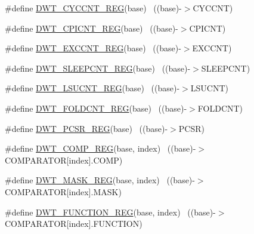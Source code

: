 \begin{DoxyCompactItemize}
\#define \hyperlink{group___d_w_t___register___accessor___macros_ga745c3ae737eb0e94dde4b3e1178920af}{D\+W\+T\+\_\+\+C\+Y\+C\+C\+N\+T\+\_\+\+R\+EG}(base)                                      ~((base)-\/$>$C\+Y\+C\+C\+NT)
\item 
\#define \hyperlink{group___d_w_t___register___accessor___macros_ga57a7caeb5e0d4038c88b5adb8a31ac4e}{D\+W\+T\+\_\+\+C\+P\+I\+C\+N\+T\+\_\+\+R\+EG}(base)                                      ~((base)-\/$>$C\+P\+I\+C\+NT)
\item 
\#define \hyperlink{group___d_w_t___register___accessor___macros_gacfd254c94211e8165496d8c22a02b996}{D\+W\+T\+\_\+\+E\+X\+C\+C\+N\+T\+\_\+\+R\+EG}(base)                                      ~((base)-\/$>$E\+X\+C\+C\+NT)
\item 
\#define \hyperlink{group___d_w_t___register___accessor___macros_gad4f054164e8c0594edcc3672d3122903}{D\+W\+T\+\_\+\+S\+L\+E\+E\+P\+C\+N\+T\+\_\+\+R\+EG}(base)                                  ~((base)-\/$>$S\+L\+E\+E\+P\+C\+NT)
\item 
\#define \hyperlink{group___d_w_t___register___accessor___macros_ga1b22a818a9d093362624b64053cd8b6d}{D\+W\+T\+\_\+\+L\+S\+U\+C\+N\+T\+\_\+\+R\+EG}(base)                                      ~((base)-\/$>$L\+S\+U\+C\+NT)
\item 
\#define \hyperlink{group___d_w_t___register___accessor___macros_gaeb8e407cb620f678d367fae5467d486a}{D\+W\+T\+\_\+\+F\+O\+L\+D\+C\+N\+T\+\_\+\+R\+EG}(base)                                    ~((base)-\/$>$F\+O\+L\+D\+C\+NT)
\item 
\#define \hyperlink{group___d_w_t___register___accessor___macros_ga19fcf102babeb34ec17bc96dd4d08e52}{D\+W\+T\+\_\+\+P\+C\+S\+R\+\_\+\+R\+EG}(base)                                          ~((base)-\/$>$P\+C\+SR)
\item 
\#define \hyperlink{group___d_w_t___register___accessor___macros_gad03eebac5bf5c3c3e461e156ba6e37ae}{D\+W\+T\+\_\+\+C\+O\+M\+P\+\_\+\+R\+EG}(base,  index)                              ~((base)-\/$>$C\+O\+M\+P\+A\+R\+A\+T\+OR\mbox{[}index\mbox{]}.C\+O\+MP)
\item 
\#define \hyperlink{group___d_w_t___register___accessor___macros_ga16461875f56f3b91ee27a53a9f4dbc78}{D\+W\+T\+\_\+\+M\+A\+S\+K\+\_\+\+R\+EG}(base,  index)                              ~((base)-\/$>$C\+O\+M\+P\+A\+R\+A\+T\+OR\mbox{[}index\mbox{]}.M\+A\+SK)
\item 
\#define \hyperlink{group___d_w_t___register___accessor___macros_gaedc0f311fdf85789a988b58375481265}{D\+W\+T\+\_\+\+F\+U\+N\+C\+T\+I\+O\+N\+\_\+\+R\+EG}(base,  index)                      ~((base)-\/$>$C\+O\+M\+P\+A\+R\+A\+T\+OR\mbox{[}index\mbox{]}.F\+U\+N\+C\+T\+I\+ON)

\end{DoxyCompactItemize}
